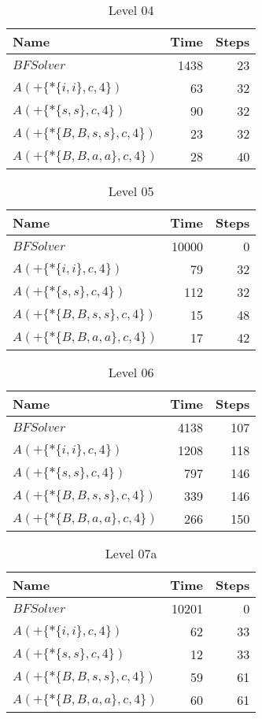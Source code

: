 \begin{table} \centering \begin{tabular}{lrr}\toprule \textbf{ Name }
    & \textbf{ Time } & \textbf{ Steps }\\\midrule
    $BFSolver$ & 1438 & 23 \\
    $A(+\{*\{i,i\},c,4\})$ & 63 & 32 \\
    $A(+\{*\{s,s\},c,4\})$ & 90 & 32 \\
    $A(+\{*\{B,B,s,s\},c,4\})$ & 23 & 32 \\
    $A(+\{*\{B,B,a,a\},c,4\})$ & 28 & 40 \\
    \bottomrule \end{tabular} \caption{Level 04}
  \label{tab:level_04} \end{table}

\begin{table} \centering \begin{tabular}{lrr}\toprule \textbf{ Name }
    & \textbf{ Time } & \textbf{ Steps }\\\midrule
    $BFSolver$ & 10000 & 0 \\
    $A(+\{*\{i,i\},c,4\})$ & 79 & 32 \\
    $A(+\{*\{s,s\},c,4\})$ & 112 & 32 \\
    $A(+\{*\{B,B,s,s\},c,4\})$ & 15 & 48 \\
    $A(+\{*\{B,B,a,a\},c,4\})$ & 17 & 42 \\
    \bottomrule \end{tabular} \caption{Level 05}
  \label{tab:level_05} \end{table}

\begin{table} \centering \begin{tabular}{lrr}\toprule \textbf{ Name }
    & \textbf{ Time } & \textbf{ Steps }\\\midrule
    $BFSolver$ & 4138 & 107 \\
    $A(+\{*\{i,i\},c,4\})$ & 1208 & 118 \\
    $A(+\{*\{s,s\},c,4\})$ & 797 & 146 \\
    $A(+\{*\{B,B,s,s\},c,4\})$ & 339 & 146 \\
    $A(+\{*\{B,B,a,a\},c,4\})$ & 266 & 150 \\
    \bottomrule \end{tabular} \caption{Level 06}
  \label{tab:level_06} \end{table}

\begin{table} \centering \begin{tabular}{lrr}\toprule \textbf{ Name }
    & \textbf{ Time } & \textbf{ Steps }\\\midrule
    $BFSolver$ & 10201 & 0 \\
    $A(+\{*\{i,i\},c,4\})$ & 62 & 33 \\
    $A(+\{*\{s,s\},c,4\})$ & 12 & 33 \\
    $A(+\{*\{B,B,s,s\},c,4\})$ & 59 & 61 \\
    $A(+\{*\{B,B,a,a\},c,4\})$ & 60 & 61 \\
    \bottomrule \end{tabular} \caption{Level 07a}
  \label{tab:level_07a} \end{table}

